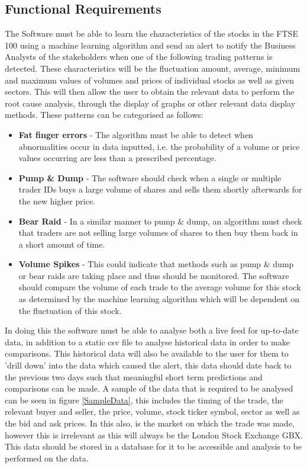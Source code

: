 \documentclass[11pt, oneside, a4paper]{article}
\begin{document}
\subsection{Functional Requirements}
The Software must be able to learn the characteristics of the stocks in the FTSE 100 using a machine learning
algorithm and send an alert to notify the Business Analysts of the stakeholders when one of the following
trading patterns is detected. These characteristics will be the fluctuation amount, average, minimum and maximum
values of volumes and prices of individual stocks as well as given sectors. This will then allow the user to obtain
the relevant data to perform the root cause analysis, through the display of graphs or other relevant data display
methods. These patterns can be categorised as follows:
\begin{itemize}
	\item \textbf{Fat finger errors} -  The algorithm must be able to detect when abnormalities occur in data inputted,
	i.e. the probability of a volume or price values occurring are less than a prescribed percentage.
	\item \textbf{Pump \& Dump} - The software should check when a single or multiple trader IDs buys a large volume of
	shares and sells them shortly afterwards for the new higher price.
	\item \textbf{Bear Raid} - In a similar manner to pump \& dump, an algorithm must check that traders are not selling
	large volumes of shares to then buy them back in a short amount of time.
	\item \textbf{Volume Spikes} - This could indicate that methods such as pump \& dump or bear raids are taking place
	and thus should be monitored. The software should compare the volume of each trade to the average volume for
	this stock as determined by the machine learning algorithm which will be dependent on the fluctuation of this stock.
\end{itemize}

In doing this the software must be able to analyse both a live feed for up-to-date data, in addition to a static
csv file to analyse historical data in order to make comparisons. This historical data will also be available to
the user for them to 'drill down' into the data which caused the alert, this data should date back to the previous
two days such that meaningful short term predictions and comparisons can be made. A sample of the data that is
required to be analysed can be seen in figure \ref{SampleData}, this includes the timing of the trade, the relevant
buyer and seller, the price, volume, stock ticker symbol, sector as well as the bid and ask prices. In this also, is the
market on which the trade was made, however this is irrelevant as this will always be the London Stock Exchange GBX.
This data should be stored in a database for it to be accessible and analysis to be performed on the data.
\end{document}
